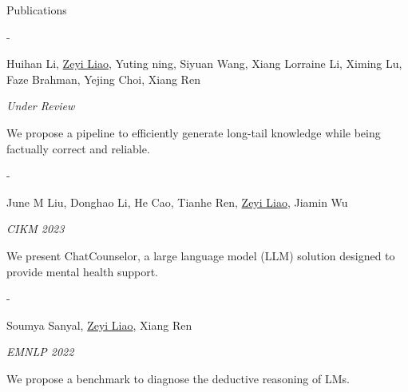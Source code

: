 \documentclass{resume} %
\begin{document}
\begin{rSection}{Publications}

\leftskip=0pt %

- {\bf {}}
\vspace{-1pt}
\begin{myinneritemize}
    \item Huihan Li, \underline{Zeyi Liao}, Yuting ning, Siyuan Wang, Xiang Lorraine Li, Ximing Lu, Faze Brahman, Yejing Choi, Xiang Ren
    \vspace{-3pt}
    \item \textit{Under Review}
    \vspace{-3pt}
    \item We propose a pipeline to efficiently generate long-tail knowledge while being factually correct and reliable.
\end{myinneritemize}


- {\bf {}}
\vspace{-3pt}
\begin{myinneritemize}
    \item June M Liu, Donghao Li, He Cao, Tianhe Ren, \underline{Zeyi Liao}, Jiamin Wu
    \vspace{-3pt}
    \item \textit{CIKM 2023}
    \vspace{-3pt}
    \item We present ChatCounselor, a large language model (LLM)
solution designed to provide mental health support.
\end{myinneritemize}

- {\bf {}}
\vspace{-3pt}
\begin{myinneritemize}
    \item Soumya Sanyal, \underline{Zeyi Liao}, Xiang Ren
    \vspace{-3pt}
    \item \textit{EMNLP 2022}
    \vspace{-3pt}
    \item We propose a benchmark to diagnose the deductive reasoning of LMs.
\end{myinneritemize}


    

\end{rSection}
\end{document}
